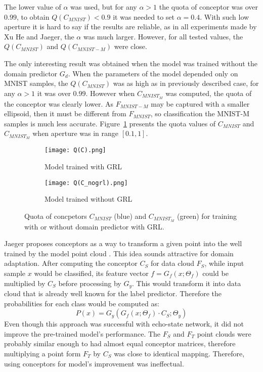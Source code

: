 \documentclass{article}
\begin{document}
\par
The lower value of $\alpha$ was used, but for any $\alpha > 1$ the quota of conceptor was over $0.99$, to obtain $Q(C_{MNIST}) < 0.9$ it was needed to set $\alpha = 0.4$. With such low aperture it is hard to say if the results are reliable, as in all experiments made by Xu He and Jaeger, the $\alpha$ was much larger. However, for all tested values, the $Q(C_{MNIST})$ and $Q(C_{MNIST-M})$ were close.
\par
The only interesting result was obtained when the model was trained without the domain predictor $G_{d}$. When the parameters of the model depended only on MNIST samples, the $Q(C_{MNIST})$ was as high as in previously described case, for any $\alpha > 1$ it was over $0.99$. However when $C_{MNIST_M}$ was computed, the quota of the conceptor was clearly lower. As $F_{MNIST-M}$ may be captured with a smaller ellipsoid, then it must be different from $F_{MNIST}$, so classification the MNIST-M samples is much less accurate. Figure~\ref{fig:Q(C)} presents the quota values of $C_{MNIST}$ and $C_{MNIST_M}$ when aperture was in range $[0.1, 1]$.

\begin{figure}
    \centering
    \begin{subfigure}[b]{0.48\textwidth}
        \texttt{[image: Q(C).png]}
        \caption{Model trained with GRL}
    \end{subfigure}%
    \begin{subfigure}[b]{0.48\textwidth}
        \texttt{[image: Q(C\_nogrl).png]}
        \caption{Model trained without GRL}
    \end{subfigure}%
    \caption{Quota of concpetors $C_{MNIST}$ (blue) and $C_{MNIST_M}$ (green) for training with or without domain predictor with GRL.}%
    \label{fig:Q(C)}%
\end{figure}
\par
Jaeger proposes conceptors as a way to transform a given point into the well trained by the model point cloud \cite{conc}. This idea sounds attractive for domain adaptation. After computing the conceptor $C_{S}$ for data cloud $F_{S}$, while input sample $x$ would be classified, its feature vector $f = G_{f}(x ; \Theta_{f})$ could be multiplied by $C_{S}$ before processing by $G_{y}$. This would transform it into data cloud that is already well known for the label predictor. Therefore the probabilities for each class would be computed as:
\begin{equation*}
  P(x) =  G_{y}( G_{f}( x ; \Theta_{f} ) \cdot C_{S} ; \Theta_{y} )    
\end{equation*}
Even though this approach was successful with echo-state network, it did not improve the pre-trained model's performance. The $F_{S}$ and $F_{T}$ point clouds were probably similar enough to had almost equal conceptor matrices, therefore multiplying a point form $F_{T}$ by $C_{S}$ was close to identical mapping. Therefore, using conceptors for model's improvement was ineffectual.
\end{document}
